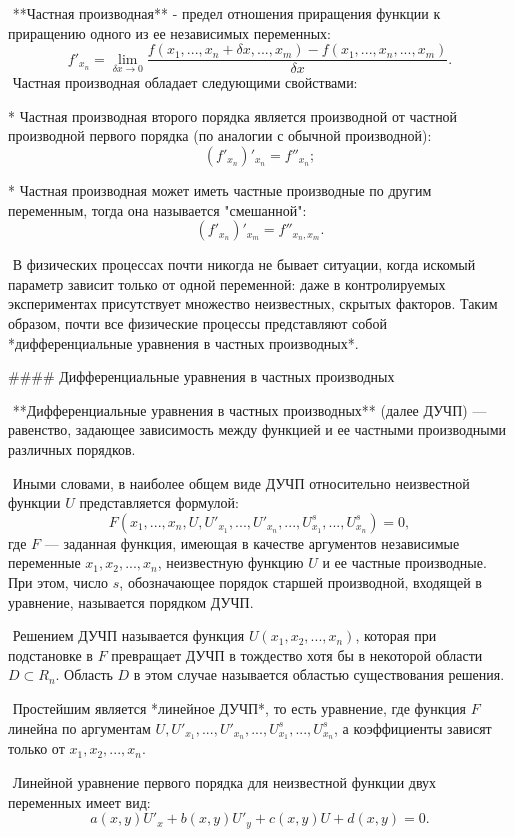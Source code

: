 ​	**Частная производная** - предел отношения приращения функции к приращению одного из ее независимых переменных:
$$
f'_{x_n} = \lim_{\delta x \to 0}
\frac{f(x_1,...,x_n+\delta x,...,x_m) - f(x_1,...,x_n,...,x_m) }
{\delta x}.
$$
​	Частная производная обладает следующими свойствами:

* Частная производная второго порядка является производной от частной производной первого порядка (по аналогии с обычной производной):
  $$
  \left( f'_{x_n} \right)'_{x_n} = f''_{x_n};
  $$

* Частная производная может иметь частные производные по другим переменным, тогда она называется "смешанной":
  $$
  \left( f'_{x_n} \right)'_{x_m} = f''_{x_n,x_m}.
  $$

​	В физических процессах почти никогда не бывает ситуации, когда искомый параметр зависит только от одной переменной: даже в контролируемых экспериментах присутствует множество неизвестных, скрытых факторов. Таким образом, почти все физические процессы представляют собой *дифференциальные уравнения в частных производных*.

#### Дифференциальные уравнения в частных производных

​	**Дифференциальные уравнения в частных производных** (далее ДУЧП) — равенство, задающее зависимость между функцией и ее частными производными различных порядков.

​	Иными словами, в наиболее общем виде ДУЧП относительно неизвестной функции $U$ представляется формулой:
$$
F\left(x_1,...,x_n,U,U'_{x_1},...,U'_{x_n},...,U^{s}_{x_1},..., U^{s}_{x_n}\right) = 0,
$$
где $F$ — заданная функция, имеющая в качестве аргументов независимые переменные $x_1, x_2, . . . , x_n$, неизвестную функцию $U$ и ее частные производные. При этом, число $s$, обозначающее порядок старшей производной, входящей в уравнение, называется порядком ДУЧП.	

​	Решением ДУЧП называется функция $U(x_1, x_2, ... , x_n)$, которая при подстановке в $F$ превращает ДУЧП в тождество хотя бы в некоторой области $D \subset R_n$. Область $D$ в этом случае называется областью существования решения.

​	Простейшим является *линейное ДУЧП*, то есть уравнение, где функция $F$ линейна по аргументам $U,U'_{x_1},...,U'_{x_n},...,U^{s}_{x_1},..., U^{s}_{x_n}$, а коэффициенты зависят только от $x_1, x_2, ..., x_n$. 

​    Линейной уравнение первого порядка для неизвестной функции двух переменных имеет вид:
$$
a(x,y)U'_x + b(x,y)U'_y + c(x,y)U + d(x,y) = 0.
$$

